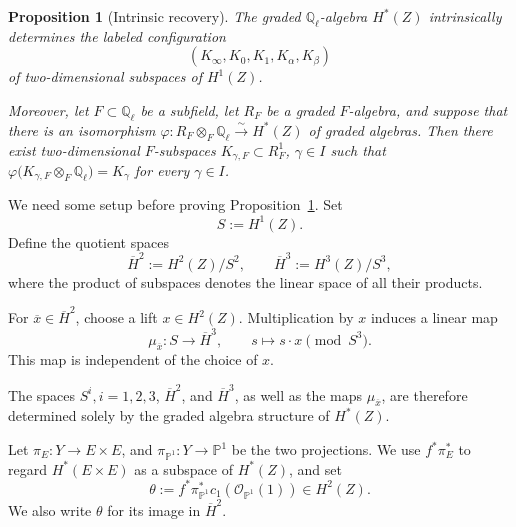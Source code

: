 \documentclass[11pt, reqno]{amsart}
\newtheorem{proposition}[theorem]{Proposition}
\theoremstyle{definition}
\newcommand\QQ{\mathbb{Q}}
\newcommand\PP{\mathbb{P}}
\newcommand\OO{\mathcal{O}}
\begin{document}
\begin{proposition}[Intrinsic recovery]
\label{prop:recovering-configuration}
The graded $\QQ_\ell$-algebra $H^*(Z)$ intrinsically determines the
labeled configuration
\[
(K_\infty,K_0,K_1,K_\alpha,K_\beta)
\]
of two-dimensional subspaces of $H^1(Z)$.

Moreover, let $F\subset\QQ_\ell$ be a subfield, let $R_F$ be a graded $F$-algebra, and suppose that there is an isomorphism $\varphi:R_F\otimes_F\QQ_\ell\xrightarrow{\sim}H^*(Z)$
of graded algebras.  Then there exist two-dimensional $F$-subspaces $K_{\gamma,F}\subset R_F^1$, $\gamma\in I$ such that $\varphi\bigl(K_{\gamma,F}\otimes_F\QQ_\ell\bigr)=K_\gamma$ for every $\gamma\in I$.
\end{proposition}

We need some setup before proving Proposition~\ref{prop:recovering-configuration}.
Set
\[
S:=H^1(Z).
\]
Define the quotient spaces
\[
\overline H^2:=H^2(Z)/S^2,
\qquad
\overline H^3:=H^3(Z)/S^3,
\]
where the product of subspaces denotes the linear space of all their products.

For $\overline{x}\in\overline H^2$, choose a lift
$x\in H^2(Z)$.  Multiplication by $x$ induces a linear map
\begin{equation}
\label{eqn:intrinsic-multiplication-map}
\mu_{\overline{x}}:S\longrightarrow\overline H^3,
\qquad
s\longmapsto s\cdot x\pmod{S^3}.
\end{equation}
This map is independent of the choice of $x$.

The spaces $S^i, i=1,2,3$, $\overline H^2$, and $\overline H^3$, as well as the maps $\mu_{\overline{x}}$, are therefore determined solely by the graded algebra structure of $H^*(Z)$.  


Let $\pi_E:Y\to E\times E$, and $\pi_{\PP^1}:Y\to\PP^1$
be the two projections.  We use $f^*\pi_E^*$ to regard
$H^*(E\times E)$ as a subspace of $H^*(Z)$, and set
\[
\theta:=f^*\pi_{\PP^1}^*c_1(\OO_{\PP^1}(1))\in H^2(Z).
\]
We also write $\theta$ for its image in $\overline H^2$.
\end{document}
